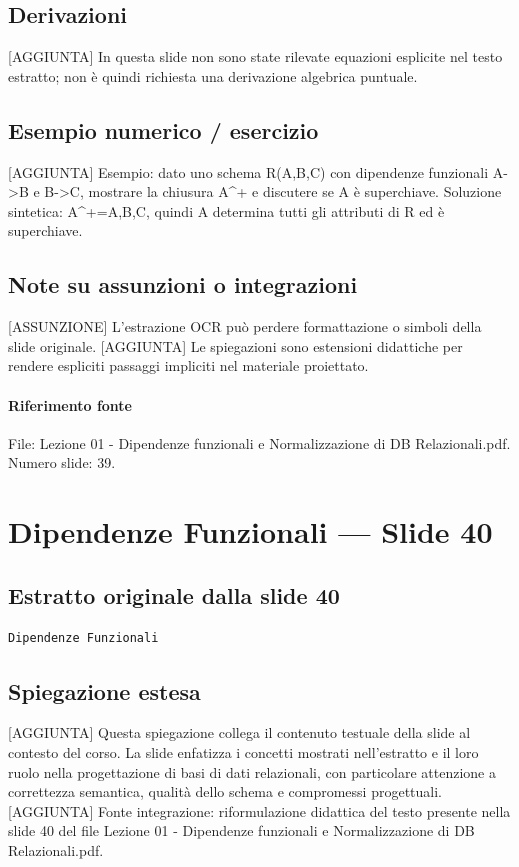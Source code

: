 \documentclass[11pt]{article}
\begin{document}
\subsection*{Derivazioni}
[AGGIUNTA] In questa slide non sono state rilevate equazioni esplicite nel testo estratto; non è quindi richiesta una derivazione algebrica puntuale.
\subsection*{Esempio numerico / esercizio}
[AGGIUNTA] Esempio: dato uno schema R(A,B,C) con dipendenze funzionali A->B e B->C, mostrare la chiusura A^+ e discutere se A è superchiave. Soluzione sintetica: A^+={A,B,C}, quindi A determina tutti gli attributi di R ed è superchiave.
\subsection*{Note su assunzioni o integrazioni}
[ASSUNZIONE] L'estrazione OCR può perdere formattazione o simboli della slide originale.
[AGGIUNTA] Le spiegazioni sono estensioni didattiche per rendere espliciti passaggi impliciti nel materiale proiettato.
\paragraph{Riferimento fonte} File: Lezione 01 - Dipendenze funzionali e Normalizzazione di DB Relazionali.pdf. Numero slide: 39.
\section{Dipendenze Funzionali --- Slide 40}
\subsection*{Estratto originale dalla slide 40}
\begin{lstlisting}
Dipendenze Funzionali
\end{lstlisting}
\subsection*{Spiegazione estesa}
[AGGIUNTA] Questa spiegazione collega il contenuto testuale della slide al contesto del corso. La slide enfatizza i concetti mostrati nell'estratto e il loro ruolo nella progettazione di basi di dati relazionali, con particolare attenzione a correttezza semantica, qualità dello schema e compromessi progettuali.
[AGGIUNTA] Fonte integrazione: riformulazione didattica del testo presente nella slide 40 del file Lezione 01 - Dipendenze funzionali e Normalizzazione di DB Relazionali.pdf.
\end{document}

